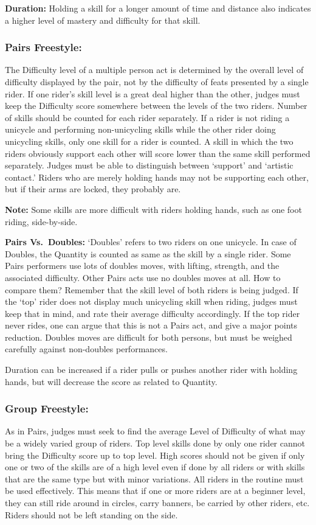 \textbf{Duration:} Holding a skill for a longer amount of time and distance also indicates a higher level of mastery and difficulty for that skill.

\subsubsection{Pairs Freestyle:}
The Difficulty level of a multiple person act is determined by the overall level of difficulty displayed by the pair, not by the difficulty of feats presented by a single rider.
If one rider's skill level is a great deal higher than the other, judges must keep the Difficulty score somewhere between the levels of the two riders.
Number of skills should be counted for each rider separately.
If a rider is not riding a unicycle and performing non-unicycling skills while the other rider doing unicycling skills, only one skill for a rider is counted.
A skill in which the two riders obviously support each other will score lower than the same skill performed separately.
Judges must be able to distinguish between `support' and `artistic contact.' Riders who are merely holding hands may not be supporting each other, but if their arms are locked, they probably are.

\textbf{Note:} Some skills are more difficult with riders holding hands, such as one foot riding, side-by-side.

\textbf{Pairs Vs.\ Doubles:} `Doubles' refers to two riders on one unicycle.
In case of Doubles, the Quantity is counted as same as the skill by a single rider.
Some Pairs performers use lots of doubles moves, with lifting, strength, and the associated difficulty.
Other Pairs acts use no doubles moves at all.
How to compare them?
Remember that the skill level of both riders is being judged.
If the `top' rider does not display much unicycling skill when riding, judges must keep that in mind, and rate their average difficulty accordingly.
If the top rider never rides, one can argue that this is not a Pairs act, and give a major points reduction.
Doubles moves are difficult for both persons, but must be weighed carefully against non-doubles performances.

Duration can be increased if a rider pulls or pushes another rider with holding hands, but will decrease the score as related to Quantity.

\subsubsection{Group Freestyle:}
As in Pairs, judges must seek to find the average Level of Difficulty of what may be a widely varied group of riders.
Top level skills done by only one rider cannot bring the Difficulty score up to top level.
High scores should not be given if only one or two of the skills are of a high level even if done by all riders or with skills that are the same type but with minor variations.
All riders in the routine must be used effectively.
This means that if one or more riders are at a beginner level, they can still ride around in circles, carry banners, be carried by other riders, etc.
Riders should not be left standing on the side.

